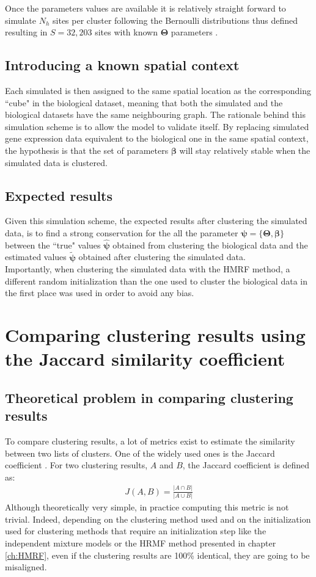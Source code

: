 	Once the parameters values are available it is relatively straight forward to simulate $N_h$ sites per cluster following the Bernoulli distributions thus defined resulting in $S=32,203$ sites with known $\boldsymbol{\Theta}$ parameters .
	\subsection{Introducing a known spatial context}\label{subsec:simul_spatial}
	Each simulated is then assigned to the same spatial location as the corresponding ``cube" in the biological dataset, meaning that both the simulated and the biological datasets have the same neighbouring graph. The rationale behind this simulation scheme is to allow the model to validate itself. By replacing simulated gene expression data equivalent to the biological one in the same spatial context, the hypothesis is that the set of parameters $\boldsymbol{\beta}$ will stay relatively stable when the simulated data is clustered.
	\subsection{Expected results}\label{subsec:expected_simul_results}
	Given this simulation scheme, the expected results after clustering the simulated data, is to find a strong conservation for the all the parameter $\boldsymbol{\psi} = \{\boldsymbol{\Theta},\boldsymbol{\beta}\}$ between the ``true" values $\hat{\boldsymbol{\psi}}$ obtained from clustering the biological data and the estimated values $\widetilde{\boldsymbol{\psi}}$ obtained after clustering the simulated data.\\
	
	Importantly, when clustering the simulated data with the HMRF method, a different random initialization than the one used to cluster the biological data in the first place was used in order to avoid any bias.

\section{Comparing clustering results using the Jaccard similarity coefficient}
	\subsection{Theoretical problem in comparing clustering results}
To compare clustering results, a lot of metrics exist to estimate the similarity between two lists of clusters. One of the widely used ones is the Jaccard coefficient \cite{jaccard1901}. For two clustering results, $A$ and $B$, the Jaccard coefficient is defined as: 
\begin{align*}
J(A,B) = \frac{|A \cap B|}{|A \cup B|}
\end{align*}
Although theoretically very simple, in practice computing this metric is not trivial. Indeed, depending on the clustering method used and on the initialization used for clustering methods that require an initialization step like the independent mixture models or the HRMF method presented in chapter \ref{ch:HMRF}, even if the clustering results are 100\% identical, they are going to be misaligned.\\

